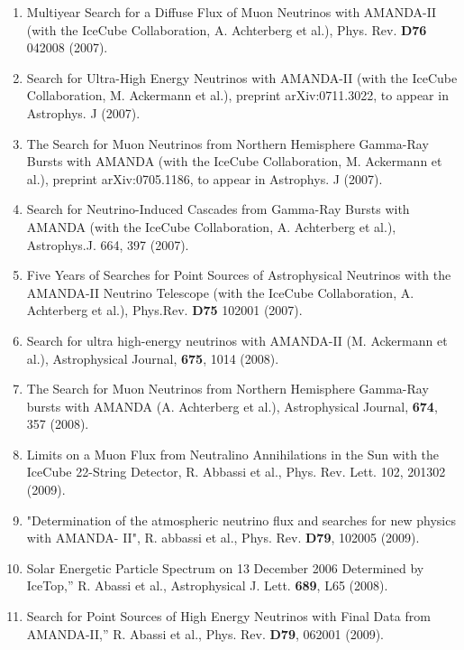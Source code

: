 \begin{enumerate}
\item Multiyear Search for a Diffuse Flux of Muon Neutrinos with AMANDA-II (with the IceCube Collaboration, A.
Achterberg et al.), Phys. Rev. {\bf D76} 042008 (2007).

\item Search for Ultra-High Energy Neutrinos with AMANDA-II (with the IceCube Collaboration, M. Ackermann et al.),
preprint arXiv:0711.3022, to appear in Astrophys. J (2007).

\item The Search for Muon Neutrinos from Northern Hemisphere Gamma-Ray Bursts with AMANDA (with the IceCube Collaboration, M. Ackermann et al.), preprint arXiv:0705.1186, to appear in Astrophys. J (2007).

\item Search for Neutrino-Induced Cascades from Gamma-Ray Bursts with AMANDA (with the IceCube Collaboration, A. Achterberg et al.), Astrophys.J. 664, 397 (2007).

\item Five Years of Searches for Point Sources of Astrophysical Neutrinos with the AMANDA-II Neutrino Telescope (with the IceCube Collaboration, A. Achterberg et al.), Phys.Rev. {\bf D75} 102001 (2007).

\item Search for ultra high-energy neutrinos with AMANDA-II (M. Ackermann et al.),  Astrophysical Journal, {\bf 675}, 1014 (2008).

\item The Search for Muon Neutrinos from Northern Hemisphere Gamma-Ray bursts with AMANDA (A. Achterberg et al.), Astrophysical Journal, {\bf 674}, 357 (2008).

\item Limits on a Muon Flux from Neutralino Annihilations in the Sun with the IceCube 22-String Detector, R. Abbassi et al., Phys. Rev. Lett. 102, 201302 (2009).  

\item "Determination of the atmospheric neutrino flux and searches for new physics with AMANDA- II", R. abbassi et al., Phys. Rev. {\bf D79}, 102005 (2009).

\item Solar Energetic Particle Spectrum on 13 December 2006 Determined by IceTop,” R. Abassi et al., Astrophysical J. Lett. {\bf 689}, L65 (2008).

\item Search for Point Sources of High Energy Neutrinos with Final Data from AMANDA-II,” R. Abassi et al., Phys. Rev. {\bf D79}, 062001 (2009).


\end{enumerate}
